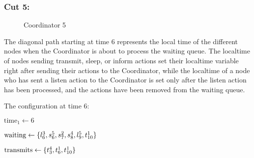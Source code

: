 \subsubsection{Cut 5:}

\begin{figure}[H]
    \centering
    \CoordinatorFigure{%

    }

    \caption{Coordinator 5}\label{tikz:coordinatormsc5}
\end{figure}

The diagonal path starting at time 6 represents the local time of the different nodes when the Coordinator is about to process the waiting queue. The localtime of nodes sending transmit, sleep, or inform actions set their localtime variable right after sending their actions to the Coordinator, while the localtime of a node who has sent a listen action to the Coordinator is set only after the listen action has been processed, and the actions have been removed from the waiting queue.

\medbreak

The configuration at time 6: \smallbreak

$\text{time}_1 \leftarrow 6$


$\text{waiting} \leftarrow \{%
    \Action{l}{3}{6}, %
    \Action{s}{5}{6}, %
    \Action{s}{2}{7}, %
    \Action{s}{4}{8}, %
    \Action{l}{5}{9}, %
    \Action{t}{1}{10} %
    \}$

$\text{transmits} \leftarrow \{ t^{4}_{3}, t^{1}_{6}, t^{1}_{10} \}$








